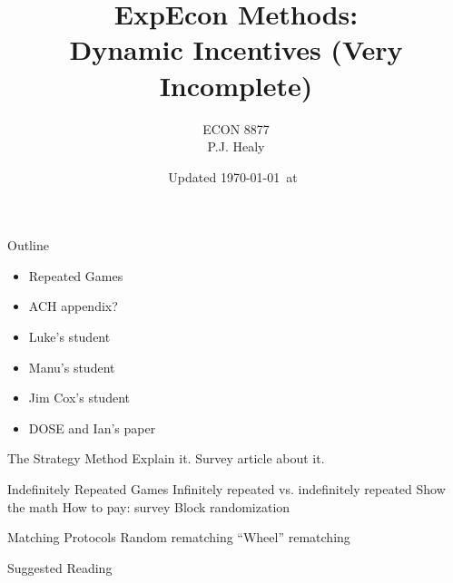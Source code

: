 

\title[Incentives in Experiments: Theory]{ExpEcon Methods:\\Dynamic Incentives (Very Incomplete)}
\author[ECON 8877]{ECON 8877\\P.J. Healy} \color{metrop}
\institute[OSU]{}
\date[]{\vfill {\tiny Updated \today\ at\ \DTMcurrenttime}}



\frame{\maketitle}


\begin{frame}{Outline}
    \begin{itemize}
        \item Repeated Games
        \item ACH appendix?
        \item Luke's student
        \item Manu's student
        \item Jim Cox's student
        \item DOSE and Ian's paper
    \end{itemize}
\end{frame}

\begin{frame}{The Strategy Method}
Explain it.
Survey article about it.    
\end{frame}

\begin{frame}{Indefinitely Repeated Games}
    Infinitely repeated vs. indefinitely repeated
    Show the math
    How to pay: survey
    Block randomization
\end{frame}

\begin{frame}{Matching Protocols}
Random rematching
``Wheel'' rematching
\end{frame}



\nocite{SherstyukEtAl2011}

\begin{frame}[allowframebreaks]{Suggested Reading}
    
\end{frame}


